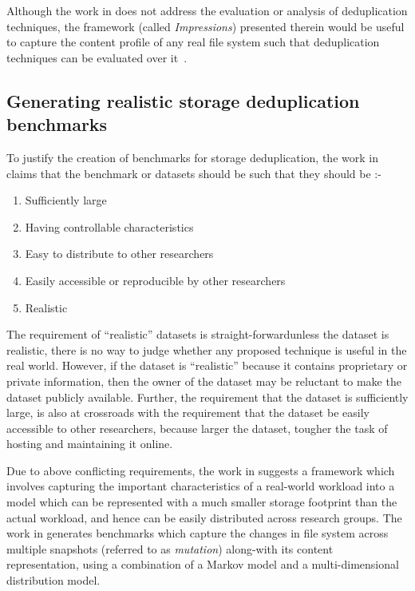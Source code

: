 Although the work in \cite{impressions} does not address the evaluation
or analysis of deduplication techniques, the framework (called \textit{Impressions})
presented therein would be useful to capture the content profile
of any real file system such that deduplication techniques can
be evaluated over it~\cite{generating-datasets}.

\subsection{Generating realistic storage deduplication benchmarks} 
To justify the creation of benchmarks for storage deduplication, the work in
\cite{generating-datasets} claims that the benchmark or datasets should be
such that they should be :-
\begin{enumerate}
		\singlespacing
	\item Sufficiently large
	\item Having controllable characteristics
	\item Easy to distribute to other researchers
	\item Easily accessible or reproducible by other researchers
	\item Realistic
\end{enumerate}

The requirement of ``realistic'' datasets is straight-forward\textemdash{}unless the
dataset is realistic, there is no way to judge whether any proposed 
technique is useful in the real world. 
However, if the dataset is ``realistic'' because it contains proprietary
or private information, then the owner of the dataset may be reluctant to
make the dataset publicly available. Further, the requirement
that the dataset is sufficiently large, is also at crossroads with the 
requirement that the dataset be easily accessible to other researchers,
because larger the dataset, tougher the task of hosting and maintaining
it online.

Due to above conflicting requirements, the work in \cite{generating-datasets}
suggests a framework which involves capturing the important characteristics
of a real-world workload into a model which can be represented with a much
smaller storage footprint than the actual workload, and hence can be easily
distributed across research groups. The work in \cite{generating-datasets}
generates benchmarks which capture the changes in file system across multiple
snapshots (referred to as \textit{mutation}) along-with its content 
representation, using a combination of a 
Markov model and a multi-dimensional distribution model.

